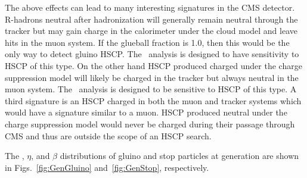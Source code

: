 The above effects can lead to many interesting signatures in the CMS detector. R-hadrons neutral after hadronization will generally remain neutral through the tracker
but may gain charge in the calorimeter under the cloud model and leave hits in the muon system. If the glueball fraction is 1.0, then this would
be the only way to detect gluino HSCP. The \muononly\ analysis is designed to have sensitivity to HSCP of this type. On the other hand HSCP produced charged under
the charge suppression model will likely be charged in the tracker but always neutral in the muon system. The \tkonly\ analysis is designed to be sensitive
to HSCP of this type. A third signature is an HSCP charged in both the muon and tracker systems which would have a signature similar to a muon.
HSCP produced neutral under the charge suppression model would never be charged during their passage through CMS and thus are outside the scope
of an HSCP search.%

The \pt, $\eta$, and $\beta$ distributions of gluino and stop particles at generation are shown in Figs.~\ref{fig:GenGluino} and~\ref{fig:GenStop}, respectively.

